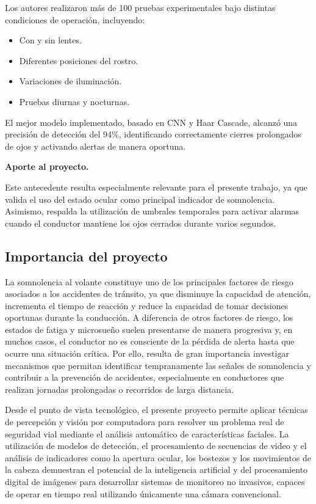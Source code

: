 \documentclass[conference]{IEEEtran}
\begin{document}
Los autores realizaron más de 100 pruebas experimentales bajo distintas condiciones de operación, incluyendo:

\begin{itemize}
\item Con y sin lentes.
\item Diferentes posiciones del rostro.
\item Variaciones de iluminación.
\item Pruebas diurnas y nocturnas.
\end{itemize}

El mejor modelo implementado, basado en CNN y Haar Cascade, alcanzó una precisión de detección del 94\%, identificando correctamente cierres prolongados de ojos y activando alertas de manera oportuna.

\textbf{Aporte al proyecto.}

Este antecedente resulta especialmente relevante para el presente trabajo, ya que valida el uso del estado ocular como principal indicador de somnolencia. Asimismo, respalda la utilización de umbrales temporales para activar alarmas cuando el conductor mantiene los ojos cerrados durante varios segundos.


\subsection{Importancia del proyecto}

La somnolencia al volante constituye uno de los principales factores de riesgo asociados a los accidentes de tránsito, ya que disminuye la capacidad de atención, incrementa el tiempo de reacción y reduce la capacidad de tomar decisiones oportunas durante la conducción. A diferencia de otros factores de riesgo, los estados de fatiga y microsueño suelen presentarse de manera progresiva y, en muchos casos, el conductor no es consciente de la pérdida de alerta hasta que ocurre una situación crítica. Por ello, resulta de gran importancia investigar mecanismos que permitan identificar tempranamente las señales de somnolencia y contribuir a la prevención de accidentes, especialmente en conductores que realizan jornadas prolongadas o recorridos de larga distancia.

Desde el punto de vista tecnológico, el presente proyecto permite aplicar técnicas de percepción y visión por computadora para resolver un problema real de seguridad vial mediante el análisis automático de características faciales. La utilización de modelos de detección, el procesamiento de secuencias de video y el análisis de indicadores como la apertura ocular, los bostezos y los movimientos de la cabeza demuestran el potencial de la inteligencia artificial y del procesamiento digital de imágenes para desarrollar sistemas de monitoreo no invasivos, capaces de operar en tiempo real utilizando únicamente una cámara convencional.
\end{document}
